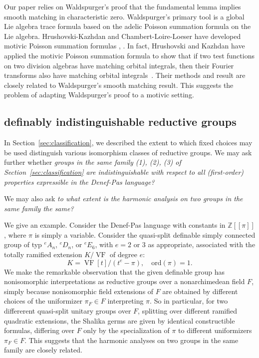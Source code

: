 \documentclass[12pt]{amsart}
\newcommand{\op}[1]{\operatorname{#1}}
\newcommand{\ring}[1]{{\mathbb #1}}
\def\VF{{\op{VF}}}
\newcommand\ord{\mathrm{ord}}
\theoremstyle{plain}
\theoremstyle{definition}
\begin{document}
Our paper relies on Waldspurger's proof that the fundamental lemma
implies smooth matching in characteristic zero.  Waldspurger's primary
tool is a global Lie algebra trace formula based on the adelic Poisson
summation formula on the Lie algebra.  Hrushovski-Kazhdan and
Chambert-Loire-Loeser have developed motivic Poisson summation
formulas \cite{hrushovski2009motivic}, \cite{chambert2013motivic}.  In fact, Hrushovski
and Kazhdan have applied the motivic Poisson summation formula to show
that if two test functions on two division algebras have matching
orbital integrals, then their Fourier transforms also have matching
orbital integrals~\cite[Theorem 1.1]{hrushovski2009motivic}.  Their methods and
result are closely related to Waldspurger's smooth matching result.
This suggests the problem of adapting Waldspurger's proof to a motivic
setting.

\subsection{definably indistinguishable reductive groups}

In Section~\ref{sec:classification}, we described the extent to which fixed choices
may be used distinguish various isomorphism classes of reductive
groups.  We may ask further whether {\it groups in the same family
  (1), (2), (3) of Section~\ref{sec:classification} are indistinguishable with respect
  to all (first-order) properties expressible in the Denef-Pas
  language?}

We may also ask {\it to what extent is the harmonic analysis on two groups
in the same family the same?}

We give an example.  Consider the Denef-Pas language with constants in
$\ring{Z}[[\pi]]$, where $\pi$ is simply a variable.  
Consider the quasi-split definable simply connected group of
typ ${}^eA_n$, ${}^eD_n$, or ${}^eE_6$, with $e=2$ or $3$ as
appropriate, associated with the totally ramified extension $K/\VF$ of
degree $e$:
\[
K = \VF[t]/(t^e - \pi),\quad \ord (\pi) = 1.
\]
We make the remarkable observation that the given definable group has
nonisomorphic interpretations as reductive groups over a
nonarchimedean field $F$, simply because nonisomorphic field
extensions of $F$ are obtained by different choices of the uniformizer
$\pi_F\in F$ interpreting $\pi$.  So in particular, for two differerent
quasi-split unitary groups over $F$, splitting over different ramified
quadratic extensions, the Shalika germs are given by identical
constructible formulas, differing over $F$ only by the specialization
of $\pi$ to different uniformizers $\pi_F\in F$.  This suggests that
the harmonic analyses on two groups in the same family are closely
related.
\end{document}
